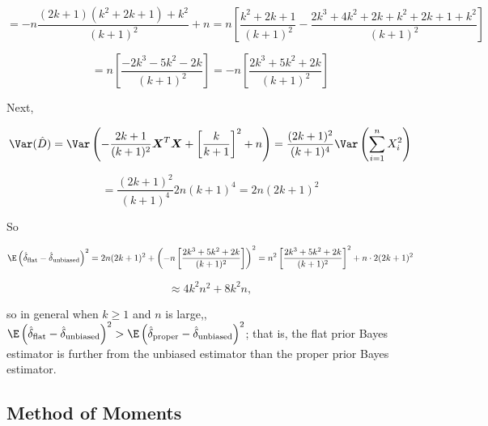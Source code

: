 \begin{solution}
\begin{enumerate}[(a)]
\[
=  -n \frac{(2k +1)(k^2 + 2k + 1) + k^2}{(k+1)^2}   + n =  n \left[ \frac{k^2 + 2k + 1}{(k+1)^2} - \frac{2k^3 + 4k^2 + 2k + k^2 + 2k + 1 + k^2}{(k+1)^2} \right]
\]

\[
=  n \left[  \frac{-2k^3 -5k^2-2k }{(k+1)^2} \right] =  -n \left[  \frac{2k^3  + 5k^2 + 2k }{(k+1)^2} \right]
\]






Next,

\[
\Var (\hat{D}) = \Var \left( - \frac{2k +1}{(k+1)^2}  \boldsymbol{X}^T\boldsymbol{X} + \left[ \frac{k}{k+1} \right]^2 + n  \right) = \frac{(2k +1)^2}{(k+1)^4}   \Var \left( \sum_{i=1}^n  X_i ^2   \right)
\]

\[
= \frac{(2k +1)^2}{(k+1)^4}   2n(k+1)^4 = 2n (2k+1)^2
\]


So

\[
\E \left( \hat{\delta}_{\text{flat}}  - \hat{\delta}_{\text{unbiased}} \right)^2 =  2n (2k+1)^2 + \left(-n \left[  \frac{2k^3  + 5k^2 + 2k }{(k+1)^2} \right] \right)^2 = n^2  \left[  \frac{2k^3  + 5k^2 + 2k }{(k+1)^2} \right] ^2 + n \cdot 2(2k+1)^2
\]

\[
\approx 4k^2 n^2 + 8k^2 n,
\]

so in general when \(k \geq 1\) and \(n\) is large,, \(\E \left( \hat{\delta}_{\text{flat}}  - \hat{\delta}_{\text{unbiased}} \right)^2 > \E \left( \hat{\delta}_{\text{proper}}  - \hat{\delta}_{\text{unbiased}} \right)^2 \); that is, the flat prior Bayes estimator is further from the unbiased estimator than the proper prior Bayes estimator.

\end{enumerate}

\end{solution}

\subsection{Method of Moments}

